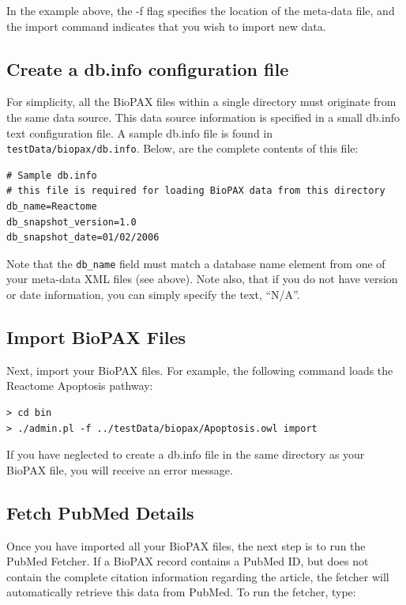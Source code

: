 \documentclass[letterpaper,12pt]{article}
\begin{document}
In the example above, the -f flag specifies the location of the meta-data file, and the import command indicates that you wish to import new data.

\subsection{Create a db.info configuration file}

For simplicity, all the BioPAX files within a single directory must originate from the same data source.  This data source information is specified in a small db.info text configuration file.  A sample db.info file is found in \verb+testData/biopax/db.info+.  Below, are the complete contents of this file:

\begin{verbatim}
# Sample db.info
# this file is required for loading BioPAX data from this directory
db_name=Reactome
db_snapshot_version=1.0
db_snapshot_date=01/02/2006
\end{verbatim}

Note that the \verb+db_name+ field must match a database name element from one of your meta-data XML files (see above).  Note also, that if you do not have version or date information, you can simply specify the text, ``N/A''.

\subsection{Import BioPAX Files}

Next, import your BioPAX files.  For example, the following command loads the Reactome Apoptosis pathway:

\begin{verbatim}
> cd bin
> ./admin.pl -f ../testData/biopax/Apoptosis.owl import
\end{verbatim}

If you have neglected to create a db.info file in the same directory as your BioPAX file, you will receive an error message.

\subsection{Fetch PubMed Details}

Once you have imported all your BioPAX files, the next step is to run the PubMed Fetcher.  If a BioPAX record contains a PubMed ID, but does not contain the complete citation information regarding the article, the fetcher will automatically retrieve this data from PubMed.  To run the fetcher, type:
\end{document}
